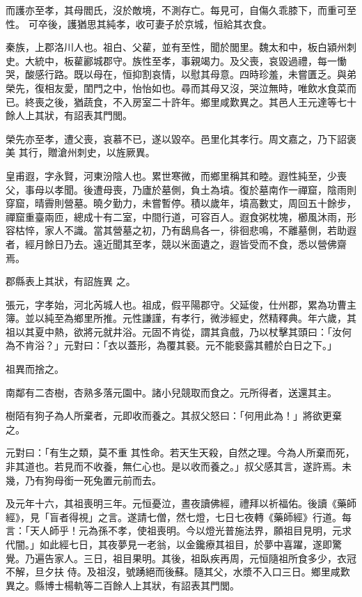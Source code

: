 \begin{pinyinscope}
 而護亦至孝，其母閻氏，沒於敵境，不測存亡。每見可，自傷久乖膝下，而重可至性。
 可卒後，護猶思其純孝，收可妻子於京城，恒給其衣食。



 秦族，上郡洛川人也。祖白、父雚，並有至性，聞於閭里。魏太和中，板白潁州刺史。大統中，板雚酈城郡守。族性至孝，事親竭力。及父喪，哀毀過禮，每一慟哭，酸感行路。既以母在，恒抑割哀情，以慰其母意。四時珍羞，未嘗匱乏。與弟榮先，復相友愛，閨門之中，怡怡如也。尋而其母又沒，哭泣無時，唯飲水食菜而已。終喪之後，猶蔬食，不入房室二十許年。鄉里咸歎異之。其邑人王元達等七十餘人上其狀，有詔表其門閭。



 榮先亦至孝，遭父喪，哀慕不已，遂以毀卒。邑里化其孝行。周文嘉之，乃下詔褒美
 其行，贈滄州刺史，以旌厥異。



 皇甫遐，字永賢，河東汾陰人也。累世寒微，而鄉里稱其和睦。遐性純至，少喪父，事母以孝聞。後遭母喪，乃廬於墓側，負土為墳。復於墓南作一禪窟，陰雨則穿窟，晴霽則營墓。曉夕勤力，未嘗暫停。積以歲年，墳高數丈，周回五十餘步，禪窟重臺兩匝，總成十有二室，中間行道，可容百人。遐食粥枕塊，櫛風沐雨，形容枯悴，家人不識。當其營墓之初，乃有鴟鳥各一，徘徊悲鳴，不離墓側，若助遐者，經月餘日乃去。遠近聞其至孝，競以米面遺之，遐皆受而不食，悉以營佛齋焉。



 郡縣表上其狀，有詔旌異
 之。



 張元，字孝始，河北芮城人也。祖成，假平陽郡守。父延俊，仕州郡，累為功曹主簿。並以純至為鄉里所推。元性謙謹，有孝行，微涉經史，然精釋典。年六歲，其祖以其夏中熱，欲將元就井浴。元固不肯從，謂其貪戲，乃以杖擊其頭曰：「汝何為不肯浴？」元對曰：「衣以蓋形，為覆其褻。元不能褻露其體於白日之下。」



 祖異而捨之。



 南鄰有二杏樹，杏熟多落元園中。諸小兒競取而食之。元所得者，送還其主。



 樹陌有狗子為人所棄者，元即收而養之。其叔父怒曰：「何用此為！」將欲更棄之。



 元對曰：「有生之類，莫不重
 其性命。若天生天殺，自然之理。今為人所棄而死，非其道也。若見而不收養，無仁心也。是以收而養之。」叔父感其言，遂許焉。未幾，乃有狗母銜一死兔置元前而去。



 及元年十六，其祖喪明三年。元恒憂泣，晝夜讀佛經，禮拜以祈福佑。後讀《藥師經》，見「盲者得視」之言。遂請七僧，然七燈，七日七夜轉《藥師經》行道。每言：「天人師乎！元為孫不孝，使祖喪明。今以燈光普施法界，願祖目見明，元求代闇。」如此經七日，其夜夢見一老翁，以金鑱療其祖目，於夢中喜躍，遂即驚覺。乃遍告家人。三日，祖目果明。其後，祖臥疾再周，元恒隨祖所食多少，衣冠不解，旦夕扶
 侍。及祖沒，號踴絕而後蘇。隨其父，水漿不入口三日。鄉里咸歎異之。縣博士楊軌等二百餘人上其狀，有詔表其門閭。




\end{pinyinscope}
